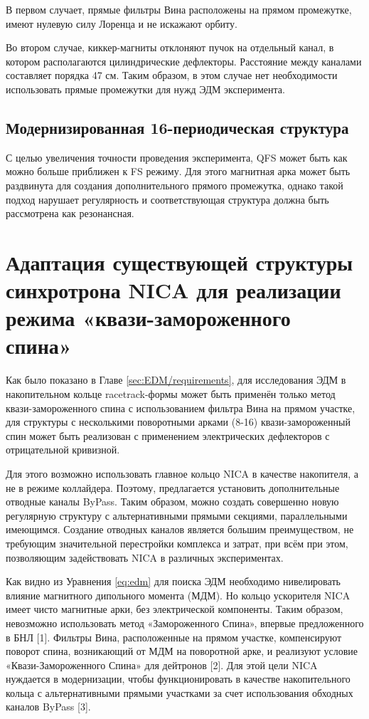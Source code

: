 В первом случает, прямые фильтры Вина расположены на прямом промежутке, имеют нулевую силу Лоренца и не искажают орбиту. 

Во втором случае, киккер-магниты отклоняют пучок на отдельный канал, в котором располагаются цилиндрические дефлекторы. Расстояние между каналами составляет порядка 47 см. Таким образом, в этом случае нет необходимости использовать прямые промежутки для нужд ЭДМ эксперимента. 

	\subsection{Модернизированная 16-периодическая структура}\label{sec:EDM/optics/16period}
\par С целью увеличения точности проведения эксперимента, QFS может быть как можно больше приближен к FS режиму. Для этого магнитная арка может быть раздвинута для создания дополнительного прямого промежутка, однако такой подход нарушает регулярность и соответствующая структура должна быть рассмотрена как резонансная.

	\section{Адаптация существующей структуры синхротрона NICA для реализации режима «квази-замороженного спина»}\label{sec:EDM/QFS}

\par Как было показано в Главе \ref{sec:EDM/requirements}, для исследования ЭДМ в накопительном кольце racetrack-формы может быть применён только метод квази-замороженного спина с использованием фильтра Вина на прямом участке, для структуры с несколькими поворотными арками (8-16) квази-замороженный спин может быть реализован с применением электрических дефлекторов с отрицательной кривизной.

\par Для этого возможно использовать главное кольцо NICA в качестве накопителя, а не в режиме коллайдера. Поэтому, предлагается установить дополнительные отводные каналы ByPass. Таким образом, можно создать совершенно новую регулярную структуру с альтернативными прямыми секциями, параллельными имеющимся. Создание отводных каналов является большим преимуществом, не требующим значительной перестройки комплекса и затрат, при всём при этом, позволяющим задействовать NICA в различных экспериментах.

\par Как видно из Уравнения \ref{eq:edm} для поиска ЭДМ необходимо нивелировать влияние магнитного дипольного момента (МДМ). Но кольцо ускорителя NICA имеет чисто магнитные арки, без электрической компоненты. Таким образом, невозможно использовать метод «Замороженного Спина», впервые предложенного в БНЛ [1]. Фильтры Вина, расположенные на прямом участке, компенсируют поворот спина, возникающий от МДМ на поворотной арке, и реализуют условие «Квази-Замороженного Спина» для дейтронов [2]. Для этой цели NICA нуждается в модернизации, чтобы функционировать в качестве накопительного кольца с альтернативными прямыми участками за счет использования обходных каналов ByPass [3].

